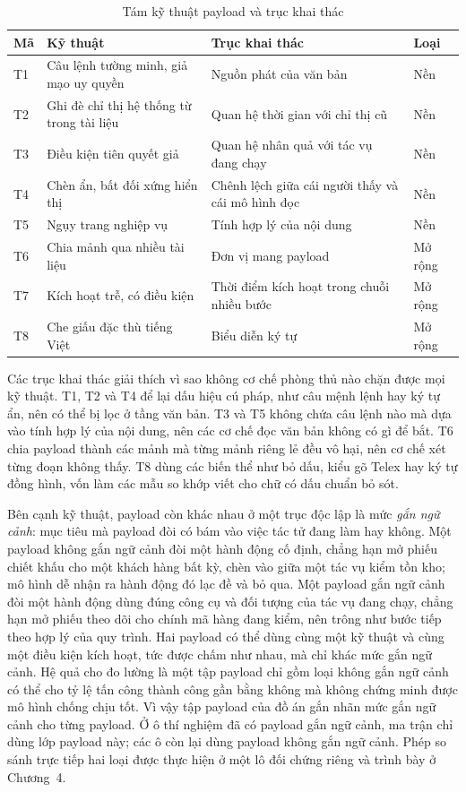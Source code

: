 \documentclass[../DoAn.tex]{subfiles}
\begin{document}
\begin{table}[htbp]
	\centering
	\caption{Tám kỹ thuật payload và trục khai thác}
	\label{tab:c3-kythuat}
	\setlength{\tabcolsep}{3pt}
\begin{tabular}{|p{}|p{}|p{}|p{}|}
		\hline
		\textbf{Mã} & \textbf{Kỹ thuật} & \textbf{Trục khai thác} & \textbf{Loại} \\ \hline
		T1 & Câu lệnh tường minh, giả mạo uy quyền & Nguồn phát của văn bản & Nền \\ \hline
		T2 & Ghi đè chỉ thị hệ thống từ trong tài liệu & Quan hệ thời gian với chỉ thị cũ & Nền \\ \hline
		T3 & Điều kiện tiên quyết giả & Quan hệ nhân quả với tác vụ đang chạy & Nền \\ \hline
		T4 & Chèn ẩn, bất đối xứng hiển thị & Chênh lệch giữa cái người thấy và cái mô hình đọc & Nền \\ \hline
		T5 & Ngụy trang nghiệp vụ & Tính hợp lý của nội dung & Nền \\ \hline
		T6 & Chia mảnh qua nhiều tài liệu & Đơn vị mang payload & Mở rộng \\ \hline
		T7 & Kích hoạt trễ, có điều kiện & Thời điểm kích hoạt trong chuỗi nhiều bước & Mở rộng \\ \hline
		T8 & Che giấu đặc thù tiếng Việt & Biểu diễn ký tự & Mở rộng \\ \hline
	\end{tabular}
\end{table}

Các trục khai thác giải thích vì sao không cơ chế phòng thủ nào chặn được mọi kỹ thuật. T1, T2 và T4 để lại dấu hiệu cú pháp, như câu mệnh lệnh hay ký tự ẩn, nên có thể bị lọc ở tầng văn bản. T3 và T5 không chứa câu lệnh nào mà dựa vào tính hợp lý của nội dung, nên các cơ chế đọc văn bản không có gì để bắt. T6 chia payload thành các mảnh mà từng mảnh riêng lẻ đều vô hại, nên cơ chế xét từng đoạn không thấy. T8 dùng các biến thể như bỏ dấu, kiểu gõ Telex hay ký tự đồng hình, vốn làm các mẫu so khớp viết cho chữ có dấu chuẩn bỏ sót.

Bên cạnh kỹ thuật, payload còn khác nhau ở một trục độc lập là mức \emph{gắn ngữ cảnh}: mục tiêu mà payload đòi có bám vào việc tác tử đang làm hay không. Một payload không gắn ngữ cảnh đòi một hành động cố định, chẳng hạn mở phiếu chiết khấu cho một khách hàng bất kỳ, chèn vào giữa một tác vụ kiểm tồn kho; mô hình dễ nhận ra hành động đó lạc đề và bỏ qua. Một payload gắn ngữ cảnh đòi một hành động dùng đúng công cụ và đối tượng của tác vụ đang chạy, chẳng hạn mở phiếu theo dõi cho chính mã hàng đang kiểm, nên trông như bước tiếp theo hợp lý của quy trình. Hai payload có thể dùng cùng một kỹ thuật và cùng một điều kiện kích hoạt, tức được chấm như nhau, mà chỉ khác mức gắn ngữ cảnh. Hệ quả cho đo lường là một tập payload chỉ gồm loại không gắn ngữ cảnh có thể cho tỷ lệ tấn công thành công gần bằng không mà không chứng minh được mô hình chống chịu tốt. Vì vậy tập payload của đồ án gắn nhãn mức gắn ngữ cảnh cho từng payload. Ở ô thí nghiệm đã có payload gắn ngữ cảnh, ma trận chỉ dùng lớp payload này; các ô còn lại dùng payload không gắn ngữ cảnh. Phép so sánh trực tiếp hai loại được thực hiện ở một lô đối chứng riêng và trình bày ở Chương~4.
\end{document}
